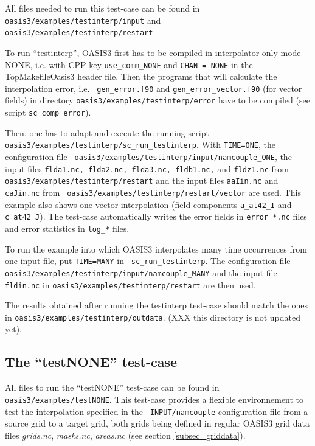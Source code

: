 All files needed to run this test-case can be found in
{\tt oasis3/examples/testinterp/input} and {\tt oasis3/examples/testinterp/restart}.

To run ``testinterp'', OASIS3 first has to be compiled in
interpolator-only mode NONE, i.e. with CPP key {\tt use\_comm\_NONE} and 
{\tt CHAN = NONE} in the TopMakefileOasis3 header file. Then
the programs that will calculate the interpolation error, i.e. {\tt
  gen\_error.f90} and {\tt gen\_error\_vector.f90} (for vector
fields) in directory {\tt oasis3/examples/testinterp/error} have to
be compiled (see script {\tt sc\_comp\_error}).

Then, one has to adapt and execute the running script {\tt
  oasis3/examples/testinterp/\break sc\_run\_testinterp}.
With {\tt TIME=ONE}, the configuration file {\tt
  oasis3/examples/testinterp/\break input/namcouple\_ONE}, the input files
{\tt flda1.nc, flda2.nc, flda3.nc, fldb1.nc,} 
and {\tt fldz1.nc} from {\tt oasis3/examples/testinterp/restart} and the
input files {\tt aaIin.nc} and {\tt caJin.nc} from {\tt
  oasis3/examples/testinterp/restart/vector} are used.  This example also
shows one vector interpolation (field components {\tt a\_at42\_I} and
{\tt c\_at42\_J}).  The test-case automatically writes the error
fields in {\tt error\_*.nc} files and error statistics in {\tt log\_*}
files.

To run the example into which OASIS3 interpolates many time
occurrences from one input file, put {\tt TIME=MANY} in {\tt
  sc\_run\_testinterp}.  The configuration file {\tt
  oasis3/examples/testinterp/\break input/namcouple\_MANY} and the input
file {\tt fldin.nc} in {\tt oasis3/examples/testinterp/\break restart} are then
used.

The results obtained after running the testinterp test-case should
match the ones in {\tt oasis3/examples/\break testinterp/outdata}.
(XXX this directory is not updated yet).

\subsection{The ``testNONE'' test-case}
\label{subsec_running_testnone}

All files to run the ``testNONE'' test-case can be found in {\tt
  oasis3/examples/testNONE}. This test-case provides a flexible
environnement to test the interpolation specified in the {\tt
  INPUT/namcouple} configuration file from a source grid to a target
grid, both grids being defined in regular OASIS3 grid data files {\it
  grids.nc}, {\it masks.nc}, {\it areas.nc} (see section
\ref{subsec_griddata}). 


